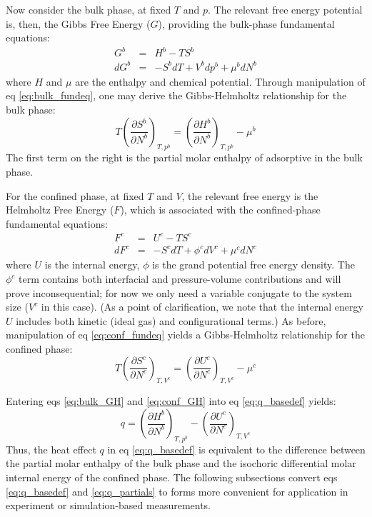 \documentclass[preprint,pre,showkeys,12pt,superscriptaddress,nofootinbib]{revtex4-1}
\begin{document}
Now consider the bulk phase, at fixed $T$ and $p$. The relevant free energy potential is, then, the Gibbs Free Energy ($G$), providing the bulk-phase fundamental equations:
%
\begin{eqnarray}
  G^b & = & H^b - TS^b \nonumber \\
  dG^b & = & -S^b dT + V^b dp^b + \mu^b dN^b
  \label{eq:bulk_fundeq}
\end{eqnarray}
%
where $H$ and $\mu$ are the enthalpy and chemical potential. Through manipulation of eq \ref{eq:bulk_fundeq}, one may derive the Gibbs-Helmholtz relationship for the bulk phase:
%
\begin{equation}
  T \left(\dfrac{\partial S^b}{\partial N^b}\right)_{T,p^b}
  = \left(\dfrac{\partial H^b}{\partial N^b}\right)_{T,p^b}
  - \mu^b
  \label{eq:bulk_GH}
\end{equation}
%
The first term on the right is the partial molar enthalpy of adsorptive in the bulk phase.

For the confined phase, at fixed $T$ and $V$, the relevant free energy is the Helmholtz Free Energy ($F$), which is associated with the confined-phase fundamental equations:
%
\begin{eqnarray}
  F^c & = & U^c - TS^c \nonumber \\
  dF^c & = & -S^c dT + \phi^c dV^c + \mu^c dN^c
  \label{eq:conf_fundeq}
\end{eqnarray}
%
where $U$ is the internal energy, $\phi$ is the grand potential free energy density. The $\phi^c$ term contains both interfacial and pressure-volume contributions and will prove inconsequential; for now we only need a variable conjugate to the system size ($V^c$ in this case)\cite{Vuong_Monte_1996,Cracknell_Adsorption_1995}. (As a point of clarification, we note that the internal energy $U$ includes both kinetic (ideal gas) and configurational terms.) As before, manipulation of eq \ref{eq:conf_fundeq} yields a Gibbs-Helmholtz relationship for the confined phase:
%
\begin{equation}
  T \left(\dfrac{\partial S^c}{\partial N^c}\right)_{T,V^c}
  = \left(\dfrac{\partial U^c}{\partial N^c}\right)_{T,V^c}
  - \mu^c
  \label{eq:conf_GH}
\end{equation}
%

Entering eqs \ref{eq:bulk_GH} and \ref{eq:conf_GH} into eq \ref{eq:q_basedef} yields:
%
\begin{equation}
  q = \left(\dfrac{\partial H^b}{\partial N^b}\right)_{T,p^b}
  - \left(\dfrac{\partial U^c}{\partial N^c}\right)_{T,V^c}
  \label{eq:q_partials}
\end{equation}
%
Thus, the heat effect $q$ in eq \ref{eq:q_basedef} is equivalent to the difference between the partial molar enthalpy of the bulk phase and the isochoric differential molar internal energy of the confined phase. The following subsections convert eqs \ref{eq:q_basedef} and \ref{eq:q_partials} to forms more convenient for application in experiment or simulation-based measurements.
\end{document}
